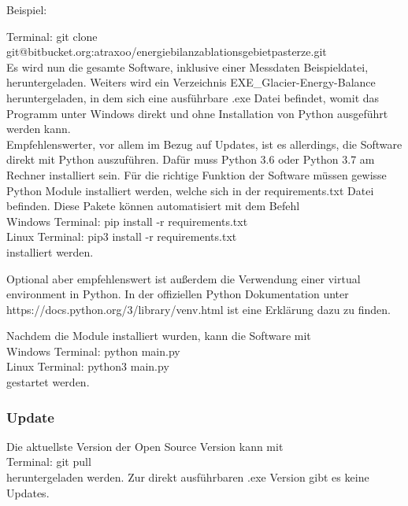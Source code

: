 \documentclass[11pt,a4paper]{article}
\begin{document}
Beispiel:

Terminal: \textsf{\small git clone git@bitbucket.org:atraxoo/energiebilanzablationsgebietpasterze.git}\\


Es wird nun die gesamte Software, inklusive einer Messdaten Beispieldatei, heruntergeladen. Weiters wird ein Verzeichnis EXE\_Glacier-Energy-Balance heruntergeladen, in dem sich eine ausführbare .exe Datei befindet, womit das Programm unter Windows direkt und ohne Installation von Python ausgeführt werden kann.\\

Empfehlenswerter, vor allem im Bezug auf Updates, ist es allerdings, die Software direkt mit Python auszuführen. Dafür muss Python 3.6 oder Python 3.7 am Rechner installiert sein. Für die richtige Funktion der Software müssen gewisse Python Module installiert werden, welche sich in der requirements.txt Datei befinden. Diese Pakete können automatisiert mit dem Befehl\\

Windows Terminal: \textsf{\small pip install -r requirements.txt}\\
Linux Terminal:  \textsf{\small pip3 install -r requirements.txt}\\

installiert werden.

Optional aber empfehlenswert ist außerdem die Verwendung einer virtual environment in Python. In der offiziellen Python Dokumentation unter \textsf{\small https://docs.python.org/3/library/venv.html} ist eine Erklärung dazu zu finden.

Nachdem die Module installiert wurden, kann die Software mit \\

Windows Terminal: \textsf{\small python main.py}\\
Linux Terminal: \textsf{\small python3 main.py}\\

gestartet werden.

\subsubsection{Update}
Die aktuellste Version der Open Source Version kann mit \\

Terminal: \textsf{\small git pull}\\

heruntergeladen werden. Zur direkt ausführbaren .exe Version gibt es keine Updates.
\end{document}
